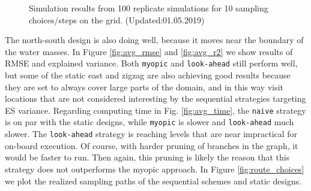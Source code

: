 \documentclass[aoas]{imsart}
\begin{document}
\begin{figure}[!th]
\caption{Simulation results from 100 replicate simulations for 10
  sampling choices/steps on the grid. (Updated:01.05.2019)} 
\label{fig:sim_results}
\end{figure}

The north-south design is also doing well, because it moves near the
boundary of the water masses. In Figure \ref{fig:avg_rmse} and
\ref{fig:avg_r2} we show results of RMSE and explained variance. Both
\texttt{myopic} and \texttt{look-ahead} still perform well, but some of
the static east and zigzag are also achieving good results because they
are set to always cover large parts of the domain, and in this way visit
locations that are not considered interesting by the sequential
strategies targeting ES variance. Regarding computing time in Fig.
\ref{fig:avg_time}, the \texttt{naive} strategy is on par with the
static designs, while \texttt{myopic} is slower and \texttt{look-ahead}
much slower. The \texttt{look-ahead} strategy is reaching levels that
are near impractical for on-board execution. Of course, with harder
pruning of branches in the graph, it would be faster to run. Then again,
this pruning is likely the reason that this strategy does not
outperforms the myopic approach. In Figure \ref{fig:route_choices} we plot the realized sampling paths of the sequential schemes and static designs.
\end{document}
